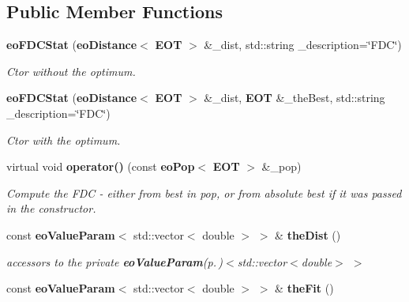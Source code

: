 \subsection*{Public Member Functions}
\begin{CompactItemize}
\item 
{\bf eo\-FDCStat} ({\bf eo\-Distance}$<$ {\bf EOT} $>$ \&\_\-dist, std::string \_\-description=\char`\"{}FDC\char`\"{})\label{classeo_f_d_c_stat_a0}

\begin{CompactList}\small\item\em Ctor without the optimum. \item\end{CompactList}\item 
{\bf eo\-FDCStat} ({\bf eo\-Distance}$<$ {\bf EOT} $>$ \&\_\-dist, {\bf EOT} \&\_\-the\-Best, std::string \_\-description=\char`\"{}FDC\char`\"{})\label{classeo_f_d_c_stat_a1}

\begin{CompactList}\small\item\em Ctor with the optimum. \item\end{CompactList}\item 
virtual void {\bf operator()} (const {\bf eo\-Pop}$<$ {\bf EOT} $>$ \&\_\-pop)\label{classeo_f_d_c_stat_a2}

\begin{CompactList}\small\item\em Compute the FDC - either from best in pop, or from absolute best if it was passed in the constructor. \item\end{CompactList}\item 
const {\bf eo\-Value\-Param}$<$ std::vector$<$ double $>$ $>$ \& {\bf the\-Dist} ()\label{classeo_f_d_c_stat_a3}

\begin{CompactList}\small\item\em accessors to the private {\bf eo\-Value\-Param}{\rm (p.\,\pageref{classeo_value_param})}$<$std::vector$<$double$>$ $>$ \item\end{CompactList}\item 
const {\bf eo\-Value\-Param}$<$ std::vector$<$ double $>$ $>$ \& {\bf the\-Fit} ()\label{classeo_f_d_c_stat_a4}

\end{CompactItemize}
